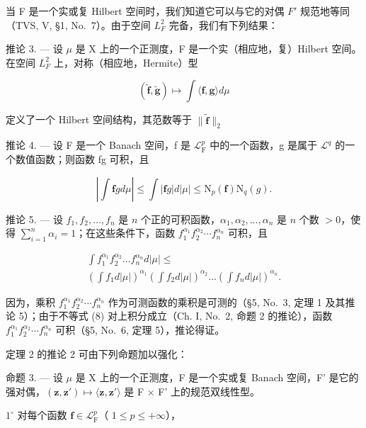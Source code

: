 当 F 是一个实或复 Hilbert 空间时，我们知道它可以与它的对偶 \(F'\) 规范地等同（TVS, V, §1, No.~7）。由于空间 \(L_{F}^{2}\) 完备，我们有下列结果：

推论 3. --- 设 \(\mu\) 是 X 上的一个正测度，F 是一个实（相应地，复）Hilbert 空间。在空间 \(L_{F}^{2}\) 上，对称（相应地，Hermite）型

\[
(\widetilde {\mathbf {f}}, \widetilde {\mathbf {g}}) \mapsto \int \langle \mathbf {f}, \mathbf {g} \rangle d \mu
\]

定义了一个 Hilbert 空间结构，其范数等于 \(\| \widetilde{\mathbf{f}}\| _2\)

推论 4. --- 设 F 是一个 Banach 空间，f 是 \(\mathcal{L}_{\mathrm{F}}^{p}\) 中的一个函数，g 是属于 \(\mathcal{L}^q\) 的一个数值函数；则函数 fg 可积，且

\[
\left| \int \mathbf {f} g d \mu \right| \leqslant \int | \mathbf {f} g | d | \mu | \leqslant \mathrm{N} _ {p} (\mathbf {f}) \mathrm{N} _ {q} (g).\tag{7}
\]

推论 5. --- 设 \(f_1, f_2, \ldots, f_n\) 是 \(n\) 个正的可积函数，\(\alpha_1, \alpha_2, \ldots, \alpha_n\) 是 \(n\) 个数 \(> 0\)，使得 \(\sum_{i=1}^{n} \alpha_i = 1\)；在这些条件下，函数 \(f_1^{\alpha_1} f_2^{\alpha_2} \cdots f_n^{\alpha_n}\) 可积，且

\[
\begin{array}{l} \int f _ {1} ^ {\alpha_ {1}} f _ {2} ^ {\alpha_ {2}} \dots f _ {n} ^ {\alpha_ {n}} d | \mu | \leqslant \\ \left(\int f _ {1} d | \mu |\right) ^ {\alpha_ {1}} \left(\int f _ {2} d | \mu |\right) ^ {\alpha_ {2}} \dots \left(\int f _ {n} d | \mu |\right) ^ {\alpha_ {n}}. \end{array}\tag{8}
\]

因为，乘积 \(f_{1}^{\alpha_{1}}f_{2}^{\alpha_{2}}\cdots f_{n}^{\alpha_{n}}\) 作为可测函数的乘积是可测的（§5, No.~3, 定理 1 及其推论 5）；由于不等式 (8) 对上积分成立（Ch. I, No.~2, 命题 2 的推论），函数 \(f_{1}^{\alpha_{1}}f_{2}^{\alpha_{2}}\cdots f_{n}^{\alpha_{n}}\) 可积（§5, No.~6, 定理 5），推论得证。

定理 2 的推论 2 可由下列命题加以强化：

命题 3. --- 设 \(\mu\) 是 X 上的一个正测度，F 是一个实或复 Banach 空间，F' 是它的强对偶，\((\mathbf{z},\mathbf{z}')\mapsto\langle\mathbf{z},\mathbf{z}'\rangle\) 是 F × F' 上的规范双线性型。

\(1^{\circ}\) 对每个函数 \(\mathbf{f} \in \mathcal{L}_{\mathrm{F}}^{p}\)（ \(1 \leqslant p \leqslant +\infty\)），

